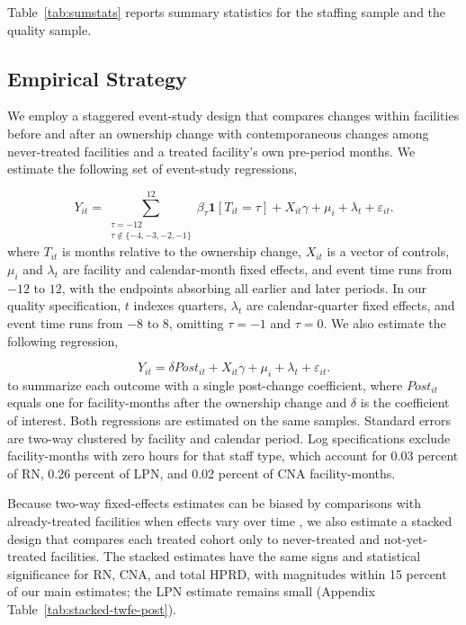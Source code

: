 \documentclass[12pt]{article}
\begin{document}
Table~\ref{tab:sumstats} reports summary statistics for the staffing sample and the quality sample.


\FloatBarrier

\subsection{Empirical Strategy}

We employ a staggered event-study design that compares changes within facilities before and after an ownership change with contemporaneous changes among never-treated facilities and a treated facility's own pre-period months. We estimate the following set of event-study regressions,

\begin{equation}
\label{eq:event-study}
Y_{it}
=
\sum_{\substack{\tau=-12\\ \tau\notin\{-4,-3,-2,-1\}}}^{12}
\beta_{\tau}\mathbf{1}[T_{it}=\tau]
+
X_{it}\gamma
+
\mu_i
+
\lambda_t
+
\varepsilon_{it}.
\end{equation}
where \(T_{it}\) is months relative to the ownership change, \(X_{it}\) is a vector of controls, \(\mu_i\) and \(\lambda_t\) are facility and calendar-month fixed effects, and event time runs from \(-12\) to \(12\), with the endpoints absorbing all earlier and later periods. In our quality specification, \(t\) indexes quarters, \(\lambda_t\) are calendar-quarter fixed effects, and event time runs from \(-8\) to \(8\), omitting \(\tau=-1\) and \(\tau=0\). We also estimate the following regression,

\begin{equation}
\label{eq:twfe-post}
Y_{it}
=
\delta \textit{Post}_{it}
+
X_{it}\gamma
+
\mu_i
+
\lambda_t
+
\varepsilon_{it}.
\end{equation}
to summarize each outcome with a single post-change coefficient, where \(\textit{Post}_{it}\) equals one for facility-months after the ownership change and \(\delta\) is the coefficient of interest. Both regressions are estimated on the same samples. Standard errors are two-way clustered by facility and calendar period. Log specifications exclude facility-months with zero hours for that staff type, which account for 0.03 percent of RN, 0.26 percent of LPN, and 0.02 percent of CNA facility-months.

Because two-way fixed-effects estimates can be biased by comparisons with already-treated facilities when effects vary over time \citep{goodman_bacon_2021}, we also estimate a stacked design that compares each treated cohort only to never-treated and not-yet-treated facilities. The stacked estimates have the same signs and statistical significance for RN, CNA, and total HPRD, with magnitudes within 15 percent of our main estimates; the LPN estimate remains small (Appendix Table~\ref{tab:stacked-twfe-post}).
\end{document}
